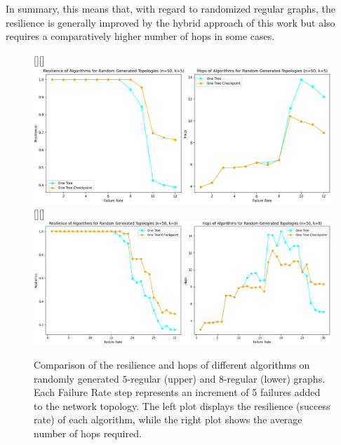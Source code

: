 \documentclass[conference]{IEEEtran}
\begin{document}
In summary, this means that, with regard to randomized regular graphs, the resilience is generally improved by the hybrid approach of this work but also requires a comparatively higher number of hops in some cases.

\begin{figure}[t]
    \centering
    \raisebox{0pt}[\height][\depth]{\hspace*{-1em}\includegraphics[scale=0.1, width=\linewidth]{figures/k5.png}}\\
    \raisebox{0pt}[\height][\depth]{\hspace*{-1em}\includegraphics[scale=0.1, width=\linewidth]{figures/k8.png}}
    \caption{Comparison of the resilience and hops of different algorithms on randomly generated $5$-regular (upper) and $8$-regular (lower) graphs. 
    Each Failure Rate step represents an increment of 5 failures added to the network topology. The left plot displays the resilience (success rate) of each algorithm, while the right plot shows the average number of hops required.}
    \label{regulartopofig}
\end{figure}

\end{document}
